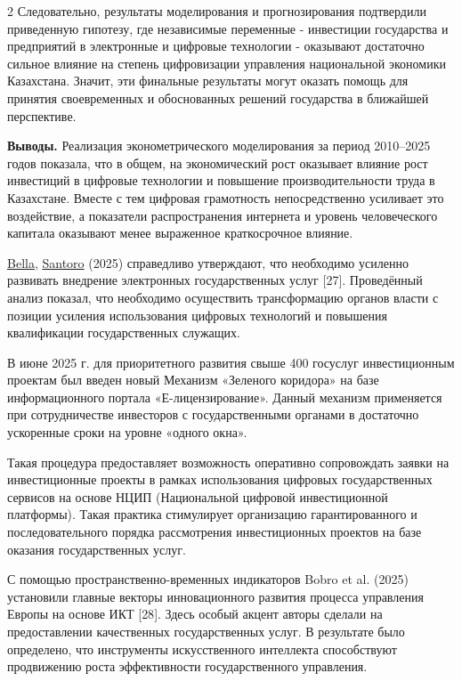 \begin{multicols}{2}
Следовательно, результаты моделирования и прогнозирования подтвердили
приведенную гипотезу, где независимые переменные - инвестиции
государства и предприятий в электронные и цифровые технологии -
оказывают достаточно сильное влияние на степень цифровизации управления
национальной экономики Казахстана. Значит, эти финальные результаты
могут оказать помощь для принятия своевременных и обоснованных решений
государства в ближайшей перспективе.

{\bfseries Выводы.} Реализация эконометрического моделирования за период
2010--2025 годов показала, что в общем, на экономический рост оказывает
влияние рост инвестиций в цифровые технологии и повышение
производительности труда в Казахстане. Вместе с тем цифровая грамотность
непосредственно усиливает это воздействие, а показатели распространения
интернета и уровень человеческого капитала оказывают менее выраженное
краткосрочное влияние.

\href{https://www.tandfonline.com/author/la+Bella\%2C+Marco+V+L}{Bella},
\href{https://www.tandfonline.com/author/Santoro\%2C+Patrizia}{Santoro}
(2025) справедливо утверждают, что необходимо усиленно развивать
внедрение электронных государственных услуг {[}27{]}. Проведённый анализ
показал, что необходимо осуществить трансформацию органов власти с
позиции усиления использования цифровых технологий и повышения
квалификации государственных служащих.

В июне 2025 г. для приоритетного развития свыше 400 госуслуг
инвестиционным проектам был введен новый Механизм «Зеленого коридора» на
базе информационного портала «Е-лицензирование». Данный механизм
применяется при сотрудничестве инвесторов с государственными органами в
достаточно ускоренные сроки на уровне «одного окна».

Такая процедура предоставляет возможность оперативно сопровождать заявки
на инвестиционные проекты в рамках использования цифровых
государственных сервисов на основе НЦИП (Национальной цифровой
инвестиционной платформы). Такая практика стимулирует организацию
гарантированного и последовательного порядка рассмотрения инвестиционных
проектов на базе оказания государственных услуг.

С помощью пространственно-временных индикаторов Bobro et al. (2025)
установили главные векторы инновационного развития процесса управления
Европы на основе ИКТ {[}28{]}. Здесь особый акцент авторы сделали на
предоставлении качественных государственных услуг. В результате было
определено, что инструменты искусственного интеллекта способствуют
продвижению роста эффективности государственного управления.


\end{multicols}
